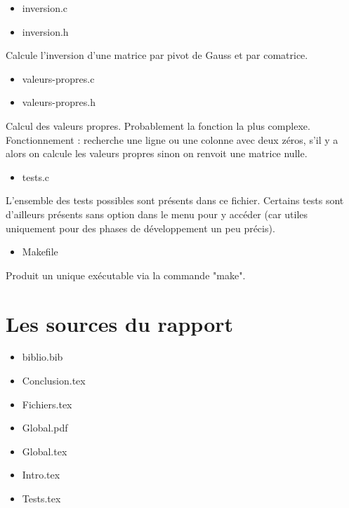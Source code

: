 \begin{itemize}
	\item inversion.c
	\item inversion.h
\end{itemize}
Calcule l'inversion d'une matrice par pivot de Gauss et par comatrice.

\begin{itemize}
	\item valeurs-propres.c
	\item valeurs-propres.h
\end{itemize}
Calcul des valeurs propres.
Probablement la fonction la plus complexe. Fonctionnement : recherche une ligne ou une colonne avec deux zéros, s'il y a alors on calcule les valeurs propres sinon on renvoit une matrice nulle.

\begin{itemize}
	\item tests.c
\end{itemize}
L'ensemble des tests possibles sont présents dans ce fichier.
Certains tests sont d'ailleurs présents sans option dans le menu pour y accéder (car utiles uniquement pour des phases de développement un peu précis).

\begin{itemize}
	\item Makefile
\end{itemize}
Produit un unique exécutable via la commande "make".

\section{Les sources du rapport}


\begin{itemize}
	\item biblio.bib
	\item Conclusion.tex
	\item Fichiers.tex
	\item Global.pdf
	\item Global.tex
	\item Intro.tex
	\item Tests.tex
\end{itemize}

\clearpage
